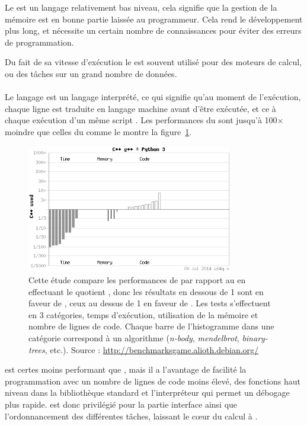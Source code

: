 Le \Cpp{} est un langage relativement bas niveau, cela signifie que la gestion de la mémoire est en bonne partie laissée au programmeur. Cela rend le développement plus long, et nécessite un certain nombre de connaissances pour éviter des erreurs de programmation.

Du fait de sa vitesse d'exécution le \Cpp{} est souvent utilisé pour des moteurs de calcul, ou des tâches sur un grand nombre de données.

			\paragraph{\Python}
Le langage \Python{} est un langage interprété, ce qui signifie qu'au moment de l'exécution, chaque ligne est traduite en langage machine avant d'être exécutée, et ce à chaque exécution d'un même script \Python. Les performances du \Python{} sont jusqu'à 100$\times$ moindre que celles du \Cpp{} comme le montre la figure~\ref{fig:cpp-py}.

	\begin{figure}
		\centering
		\includegraphics[width=0.8\textwidth]{img/cpp-py.png}
		\caption[Comparaison des performances entre \Cpp{} et \Python]{Cette étude compare les performances de \Python{} par rapport au \Cpp{} en effectuant le quotient , donc les résultats en dessous de 1 sont en faveur de \Cpp{}, ceux au dessus de 1 en faveur de \Python{}. Les tests s'effectuent en 3 catégories, temps d'exécution, utilisation de la mémoire et nombre de lignes de code. Chaque barre de l'histogramme dans une catégorie correspond à un algorithme (\emph{n-body}, \emph{mendelbrot}, \emph{binary-trees}, etc.). Source : \url{http://benchmarksgame.alioth.debian.org/}}
		\label{fig:cpp-py}
	\end{figure}

\Python{} est certes moins performant que \Cpp{}, mais il a l'avantage de facilité la programmation avec un nombre de lignes de code moins élevé, des fonctions haut niveau dans la bibliothèque standard et l'interpréteur qui permet un débogage plus rapide. \Python{} est donc privilégié pour la partie interface ainsi que l'ordonnancement des différentes tâches, laissant le cœur du calcul à \Cpp{}.


